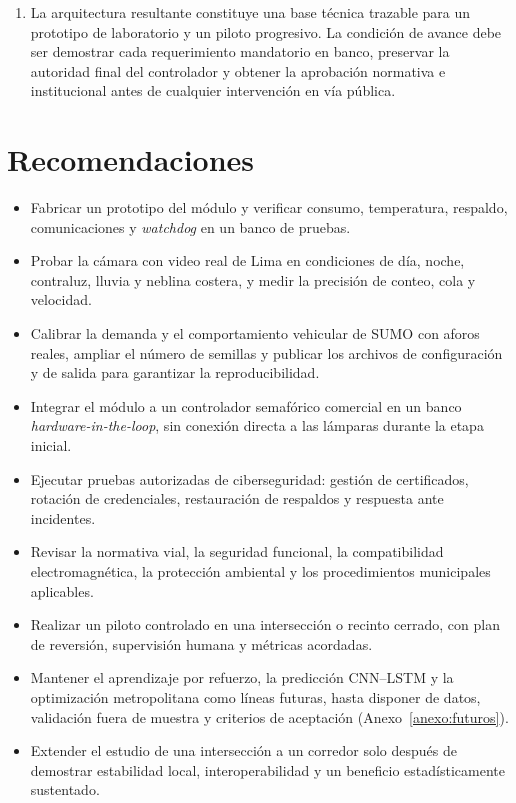 \begin{enumerate}
\item La arquitectura resultante constituye una base técnica trazable para un prototipo de laboratorio y un
piloto progresivo. La condición de avance debe ser demostrar cada requerimiento mandatorio en banco,
preservar la autoridad final del controlador y obtener la aprobación normativa e institucional antes de
cualquier intervención en vía pública.
\end{enumerate}

\section*{Recomendaciones}

\begin{itemize}
\item Fabricar un prototipo del módulo y verificar consumo, temperatura, respaldo, comunicaciones y
\textit{watchdog} en un banco de pruebas.
\item Probar la cámara con video real de Lima en condiciones de día, noche, contraluz, lluvia y neblina
costera, y medir la precisión de conteo, cola y velocidad.
\item Calibrar la demanda y el comportamiento vehicular de SUMO con aforos reales, ampliar el número de
semillas y publicar los archivos de configuración y de salida para garantizar la reproducibilidad.
\item Integrar el módulo a un controlador semafórico comercial en un banco \textit{hardware-in-the-loop},
sin conexión directa a las lámparas durante la etapa inicial.
\item Ejecutar pruebas autorizadas de ciberseguridad: gestión de certificados, rotación de credenciales,
restauración de respaldos y respuesta ante incidentes.
\item Revisar la normativa vial, la seguridad funcional, la compatibilidad electromagnética, la protección
ambiental y los procedimientos municipales aplicables.
\item Realizar un piloto controlado en una intersección o recinto cerrado, con plan de reversión,
supervisión humana y métricas acordadas.
\item Mantener el aprendizaje por refuerzo, la predicción CNN--LSTM y la optimización metropolitana como
líneas futuras, hasta disponer de datos, validación fuera de muestra y criterios de aceptación
(Anexo~\ref{anexo:futuros}).
\item Extender el estudio de una intersección a un corredor solo después de demostrar estabilidad local,
interoperabilidad y un beneficio estadísticamente sustentado.
\end{itemize}

